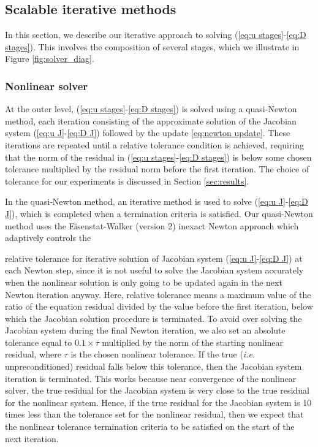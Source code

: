\documentclass[a4paper, 12pt]{article}
\newcommand{\revisedA}[1]{#1}
\begin{document}
\subsection{\revisedA{Scalable iterative methods}}

\revisedA{In this section, we describe our iterative approach to
  solving (\ref{eq:u stages}-\ref{eq:D stages}). This involves
  the composition of several stages, which we illustrate in Figure
  \ref{fig:solver_diag}.

\subsubsection{Nonlinear solver}
  
  At the outer level, (\ref{eq:u stages}-\ref{eq:D stages}) is solved
  using a quasi-Newton method, each iteration consisting of the
  approximate solution of the Jacobian system (\ref{eq:u J}-\ref{eq:D J}) followed by the
  update \eqref{eq:newton update}. These iterations are repeated until
  a relative tolerance condition is achieved, requiring that the norm
  of the residual in (\ref{eq:u stages}-\ref{eq:D stages}) is below
  some chosen tolerance multiplied by the residual norm before the
  first iteration. The choice of tolerance for our experiments is
  discussed in Section \ref{sec:results}.

  In the quasi-Newton method, an iterative method is used to solve
  (\ref{eq:u J}-\ref{eq:D J}), which is completed when a termination
  criteria is satisfied.  
  Our quasi-Newton method uses the Eisenstat-Walker (version 2)
  inexact Newton approach \citep{eisenstat1996choosing} which
  adaptively controls the {relative tolerance for iterative
    solution of Jacobian system (\ref{eq:u J}-\ref{eq:D J}) at each
    Newton step, since it is not useful to solve the Jacobian
  system accurately when the nonlinear solution is only going to be
  updated again in the next Newton iteration anyway. Here, relative
  tolerance means a maximum value of the ratio of the equation residual
  divided by the value before the first iteration, below which the
  Jacobian solution procedure is terminated.
  To avoid over solving the Jacobian system during the final Newton
  iteration, we also set an absolute tolerance equal to $0.1\times
  \tau$ multiplied by the norm of the starting nonlinear residual,
  where $\tau$ is the chosen nonlinear tolerance. If the true
  (\emph{i.e.} unpreconditioned) residual falls below this tolerance,
  then the Jacobian system iteration
  is terminated.  This works because
  near convergence of the nonlinear solver, the true residual for the
  Jacobian system is very close to the true residual for the nonlinear
  system. Hence, if the true residual for the Jacobian system is 10
  times less than the tolerance set for the nonlinear residual, then
  we expect that the nonlinear tolerance termination criteria to be
  satisfied on the start of the next iteration.

}}
\end{document}
